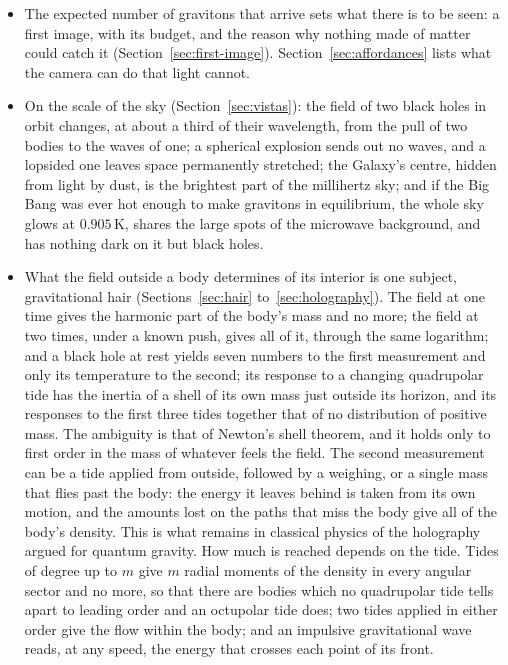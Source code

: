 \begin{itemize}
all six polarizations of a wave in one reading. Its magnetic part separates a
wave from the pull of nearby objects at a fixed cost in noise, and supplies the
one scale the electric part lacks, so a single pixel ranges a moving mass; a
few pixels side by side measure distance from how the field varies.
\item The expected number of gravitons that arrive sets what there is to be
seen: a first image, with its budget, and the reason why nothing made of
matter could catch it (Section~\ref{sec:first-image}).
Section~\ref{sec:affordances} lists what the camera can do that light cannot.
\item On the scale of the sky (Section~\ref{sec:vistas}): the field of two
black holes in orbit changes, at about a third of their wavelength, from the pull of
two bodies to the waves of one; a spherical explosion sends out no waves,
and a lopsided one leaves space permanently stretched;
the Galaxy's centre, hidden from light by dust, is the brightest part of the
millihertz sky; and if the Big Bang was ever hot enough to make gravitons in
equilibrium, the whole sky glows at $0.905\,\mathrm{K}$, shares the large
spots of the microwave background, and has nothing dark on it but black
holes.
\item What the field outside a body determines of its interior is one
subject, gravitational hair (Sections~\ref{sec:hair} to~\ref{sec:holography}). The field at one time
gives the harmonic part of the body's mass and no more; the field at two times,
under a known push, gives all of it, through the same logarithm; and a black hole at rest yields seven
numbers to the first measurement and only its temperature to the second; its
response to a changing quadrupolar tide has the inertia of a shell of its own
mass just outside its horizon, and its responses to the first three tides
together that of no distribution of positive mass. The ambiguity is that of Newton's shell
theorem, and it holds only to first order in the mass of whatever feels the
field. The second measurement can be a tide applied from outside, followed by
a weighing, or a single mass that flies past the body: the energy it leaves
behind is taken from its own motion, and the amounts lost on the paths that
miss the body give all of the body's density. This is what remains in
classical physics of the holography argued for quantum gravity.
How much is reached depends on the tide. Tides of degree up to $m$ give $m$
radial moments of the density in every angular sector and no more, so that
there are bodies which no quadrupolar tide tells apart to leading order and an octupolar tide
does; two tides applied in either order give the flow within the body; and
an impulsive gravitational wave reads, at any speed, the energy that crosses
each point of its front.
\end{itemize}

